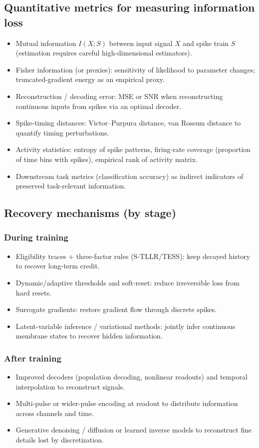\documentclass{article}
\begin{document}
\subsection{Quantitative metrics for measuring information loss}
\begin{itemize}
  \item Mutual information $I(X;S)$ between input signal $X$ and spike train $S$ (estimation requires careful high-dimensional estimators).
  \item Fisher information (or proxies): sensitivity of likelihood to parameter changes; truncated-gradient energy as an empirical proxy.
  \item Reconstruction / decoding error: MSE or SNR when reconstructing continuous inputs from spikes via an optimal decoder.
  \item Spike-timing distances: Victor--Purpura distance, van Rossum distance to quantify timing perturbations.
  \item Activity statistics: entropy of spike patterns, firing-rate coverage (proportion of time bins with spikes), empirical rank of activity matrix.
  \item Downstream task metrics (classification accuracy) as indirect indicators of preserved task-relevant information.
\end{itemize}

\subsection{Recovery mechanisms (by stage)}
\subsubsection{During training}
\begin{itemize}
  \item Eligibility traces + three-factor rules (S-TLLR/TESS): keep decayed history to recover long-term credit.
  \item Dynamic/adaptive thresholds and soft-reset: reduce irreversible loss from hard resets.
  \item Surrogate gradients: restore gradient flow through discrete spikes.
  \item Latent-variable inference / variational methods: jointly infer continuous membrane states to recover hidden information.
\end{itemize}
\subsubsection{After training}
\begin{itemize}
  \item Improved decoders (population decoding, nonlinear readouts) and temporal interpolation to reconstruct signals.
  \item Multi-pulse or wider-pulse encoding at readout to distribute information across channels and time.
  \item Generative denoising / diffusion or learned inverse models to reconstruct fine details lost by discretization.
\end{itemize}
\end{document}
